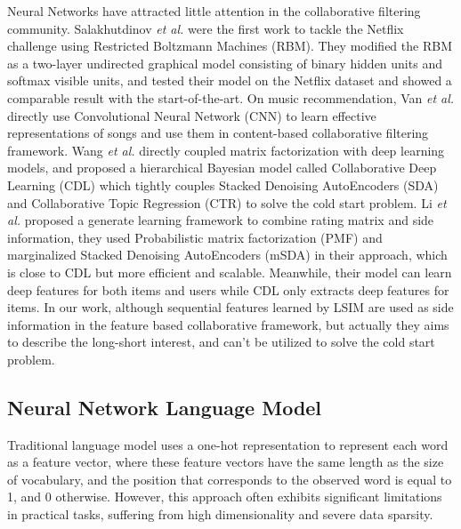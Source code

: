 \documentclass{sig-alternate-05-2015}
\begin{document}
Neural Networks have attracted little attention in the collaborative filtering community.
Salakhutdinov \textit{et al.} \cite{salakhutdinov2007restricted} were the first
work to tackle the Netflix challenge using Restricted Boltzmann Machines (RBM).
They modified the RBM as a two-layer undirected graphical model
consisting of binary hidden units and softmax visible units,
and tested their model on the Netflix dataset and
showed a comparable result with the start-of-the-art.
On music recommendation, Van \textit{et al.} \cite{van2013deep}
directly use Convolutional Neural Network (CNN) to learn effective representations
of songs and use them in content-based collaborative filtering framework.
Wang \textit{et al.} \cite{wang2015collaborative} 
directly coupled matrix factorization with deep learning models,
and proposed a hierarchical Bayesian model called Collaborative Deep Learning (CDL)
which tightly couples Stacked Denoising AutoEncoders (SDA) \cite{vincent2008extracting} and
Collaborative Topic Regression (CTR) \cite{wang2011collaborative} to solve the cold start problem.
Li \textit{et al.} \cite{li2015deep} proposed a generate learning framework
to combine rating matrix and side information, they used 
Probabilistic matrix factorization (PMF) \cite{salakhutdinov2011probabilistic} and
marginalized Stacked Denoising AutoEncoders (mSDA) \cite{chen2012marginalized}
in their approach, which is close to CDL but more efficient and scalable.
Meanwhile, their model can learn deep features for both items and users
while CDL only extracts deep features for items.
In our work, although sequential features learned by LSIM are used as side information
in the feature based collaborative framework, but actually they aims to describe
the long-short interest, and can't be utilized to solve the cold start problem.

\subsection{Neural Network Language Model}
Traditional language model uses a one-hot representation to represent each word
as a feature vector, where these feature vectors have the same length as the size
of vocabulary, and the position that corresponds to the observed word is equal to 1,
and 0 otherwise. However, this approach often exhibits significant limitations
in practical tasks, suffering from high dimensionality and severe data sparsity.
\end{document}
